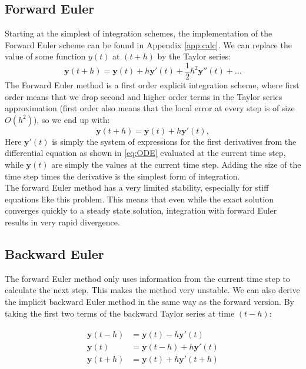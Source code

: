 \documentclass{article}
\begin{document}
\subsection{Forward Euler}
\label{ssec:feuler}
Starting at the simplest of integration schemes, the implementation of the Forward Euler scheme can be found in Appendix \ref{app:calc}. We can replace the value of some function $y(t)$ at $(t+h)$ by the Taylor series:
\begin{equation}
\mathbf{y}(t+h) = \mathbf{y}(t) + h \mathbf{y}'(t) + \frac{1}{2} h^2 \mathbf{y}''(t) + \dots
\end{equation}
The Forward Euler method is a first order explicit integration scheme, where first order means that we drop second and higher order terms in the Taylor series approximation (first order also means that the local error at every step is of size $O(h^2)$), so we end up with:
\begin{equation}
\mathbf{y}(t+h) = \mathbf{y}(t) + h \mathbf{y}'(t),
\end{equation}
Here $\mathbf{y}'(t)$ is simply the system of expressions for the first derivatives from the differential equation as shown in \eqref{eq:ODE} evaluated at the current time step, while $\mathbf{y}(t)$ are simply the values at the current time step. Adding the size of the time step times the derivative is the simplest form of integration. \\
The forward Euler method has a very limited stability, especially for stiff equations like this problem. This means that even while the exact solution converges quickly to a steady state solution, integration with forward Euler results in very rapid divergence.  

\subsection{Backward Euler}
The forward Euler method only uses information from the current time step to calculate the next step. This makes the method very unstable. We can also derive the implicit backward Euler method in the same way as the forward version. By taking the first two terms of the backward Taylor series at time $(t-h)$:

\begin{align}
\begin{split}
\mathbf{y}(t-h) &= \mathbf{y}(t) - h \mathbf{y}'(t)\\
\mathbf{y}(t) &= \mathbf{y}(t - h) + h \mathbf{y}'(t)\\
\mathbf{y}(t + h) &= \mathbf{y}(t) + h \mathbf{y}'(t + h)
\end{split}
\label{eq:beuler}
\end{align}
\end{document}
